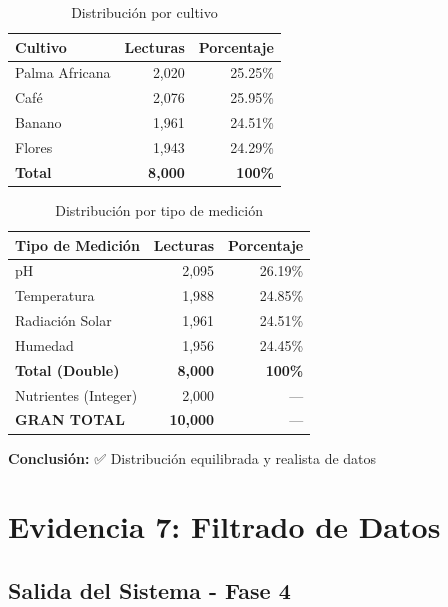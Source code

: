 \documentclass[12pt,a4paper]{article}
\begin{document}
\begin{table}[h]
\centering
\begin{tabular}{|l|r|r|}
\hline
\rowcolor{agrogreen!20}
\textbf{Cultivo} & \textbf{Lecturas} & \textbf{Porcentaje} \\
\hline
Palma Africana & 2,020 & 25.25\% \\
Café & 2,076 & 25.95\% \\
Banano & 1,961 & 24.51\% \\
Flores & 1,943 & 24.29\% \\
\hline
\textbf{Total} & \textbf{8,000} & \textbf{100\%} \\
\hline
\end{tabular}
\caption{Distribución por cultivo}
\label{tab:distribucion-cultivo}
\end{table}

\begin{table}[h]
\centering
\begin{tabular}{|l|r|r|}
\hline
\rowcolor{agrogreen!20}
\textbf{Tipo de Medición} & \textbf{Lecturas} & \textbf{Porcentaje} \\
\hline
pH & 2,095 & 26.19\% \\
Temperatura & 1,988 & 24.85\% \\
Radiación Solar & 1,961 & 24.51\% \\
Humedad & 1,956 & 24.45\% \\
\hline
\textbf{Total (Double)} & \textbf{8,000} & \textbf{100\%} \\
\hline
Nutrientes (Integer) & 2,000 & --- \\
\hline
\textbf{GRAN TOTAL} & \textbf{10,000} & --- \\
\hline
\end{tabular}
\caption{Distribución por tipo de medición}
\label{tab:distribucion-tipo}
\end{table}

\textbf{Conclusión:} ✅ Distribución equilibrada y realista de datos


\section{Evidencia 7: Filtrado de Datos}

\subsection{Salida del Sistema - Fase 4}
\end{document}
